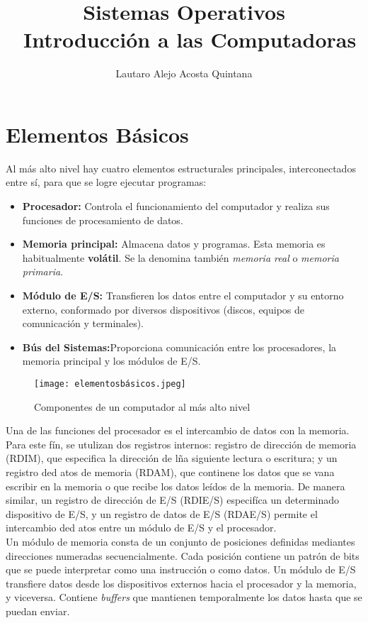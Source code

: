 \documentclass[12pt, a4paper]{article}
\title{Sistemas Operativos\\\ Introducción a las Computadoras}
\author{Lautaro Alejo Acosta Quintana}
\begin{document}
    \maketitle
    \section{Elementos Básicos}
    Al más alto nivel hay cuatro elementos estructurales principales, interconectados entre sí, para que se logre ejecutar programas:
    \begin{itemize}
        \item \textbf{Procesador:} Controla el funcionamiento del computador y realiza sus funciones de procesamiento de datos.
    \item \textbf{Memoria principal:} Almacena datos y programas. Esta memoria es habitualmente \textbf{volátil}. Se la denomina también \textit{memoria real} o \textit{memoria primaria}.
\item \textbf{Módulo de E/S:} Transfieren los datos entre el computador y su entorno externo, conformado por diversos dispositivos (discos, equipos de comunicación y terminales).
    \item \textbf{Bús del Sistemas:}Proporciona comunicación entre los procesadores, la memoria principal y los módulos de E/S.
    \end{itemize}

\begin{figure}[hbt!]
    \centering
    \texttt{[image: elementosbásicos.jpeg]}\par
    \caption{Componentes de un computador al más alto nivel}
\end{figure}

    Una de las funciones del procesador es el intercambio de datos con la memoria. Para este fín, se utulizan dos registros internos: registro de dirección de memoria (RDIM), que especifica la dirección de lña siguiente lectura o escritura; y un registro ded atos de memoria (RDAM), que continene los datos que se vana  escribir en la memoria o que recibe los datos leídos de la memoria. De manera similar, un registro de dirección de E/S (RDIE/S) especifíca un determinado dispositivo de E/S, y un registro de datos de E/S (RDAE/S) permite el intercambio ded atos entre un módulo de E/S y el procesador. \\ 
    Un módulo de memoria consta de un conjunto de posiciones definidas mediantes direcciones numeradas secuencialmente. Cada posición contiene un patrón de bits que se puede interpretar como una instrucción o como datos. Un módulo de E/S transfiere datos desde los dispositivos externos hacia el procesador y la memoria, y viceversa. Contiene \textit{buffers} que mantienen temporalmente los datos hasta que se puedan enviar.
\end{document}
